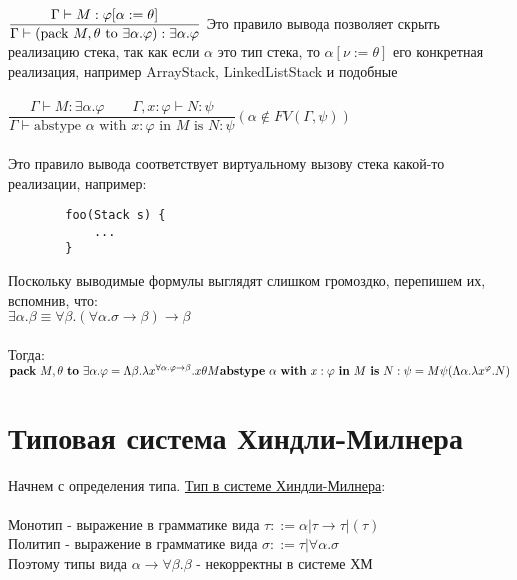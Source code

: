 	
 	$\dfrac{\Gamma \vdash M : \varphi[\alpha := \theta]}{\Gamma\vdash (\text{pack } M, \theta \text{ to } \exists \alpha . \varphi) : \exists \alpha.\varphi}\\ \\ \\
 	 $ Это правило вывода позволяет скрыть реализацию стека, так как если $\alpha$ это тип стека, то $\alpha[\nu := \theta]$ его конкретная реализация, например ArrayStack, LinkedListStack и подобные \\ \\
 	 $
 	\dfrac{\Gamma \vdash M : \exists \alpha . \varphi\qquad\Gamma, x : \varphi \vdash N : \psi}{\Gamma \vdash \text{abstype } \alpha \text{ with } x:\varphi \text{ in } M \text{ is } N:\psi}
	(\alpha \notin FV(\Gamma, \psi))$
	\\ \\
	Это правило вывода соответствует виртуальному вызову стека какой-то реализации, например: 
	\begin{verbatim}
		foo(Stack s) {
			...
		}
	\end{verbatim}
	Поскольку выводимые формулы выглядят слишком громоздко, перепишем их, вспомнив, что: \\
	$\exists\alpha.\beta\equiv\forall\beta.(\forall\alpha.\sigma\rightarrow\beta)\rightarrow\beta$\\\\
	Тогда: \\
	$	\text{\textbf{pack} } M, \theta \text{ \textbf{to} } \exists \alpha . \varphi =
		\Lambda \beta . \lambda x^{\forall \alpha . \varphi \to \beta} . x \theta M \\
		\text{\textbf{abstype} } \alpha \text{ \textbf{with} } x:\varphi \text{ \textbf{in} } M \text{ \textbf{is} } N:\psi =
		M \psi (\Lambda \alpha . \lambda x ^ \varphi . N)
	$
	
	 \section{Типовая система Хиндли-Милнера}
	   
	 Начнем с определения типа. \underline{Тип в системе Хиндли-Милнера}: \\ \\
	 Монотип - выражение в грамматике вида $\tau::=\alpha|\tau\rightarrow\tau|(\tau)$\\
	 Политип - выражение в грамматике вида $\sigma::=\tau|\forall\alpha.\sigma$\\
	 
	 \noindent Поэтому типы вида $\alpha\rightarrow\forall\beta.\beta$ - некорректны в системе ХМ\\
	 

